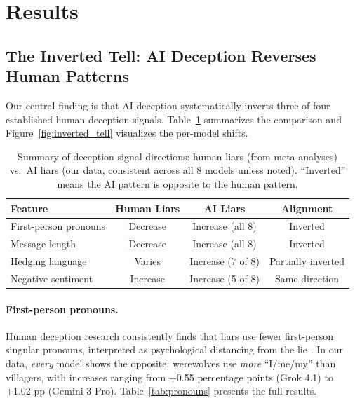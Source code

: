 \section{Results}
\label{sec:results}

\subsection{The Inverted Tell: AI Deception Reverses Human Patterns}
\label{sec:inverted_tell}

Our central finding is that AI deception systematically inverts three of four established human deception signals. Table~\ref{tab:inversion_summary} summarizes the comparison and Figure~\ref{fig:inverted_tell} visualizes the per-model shifts.

\begin{table}[t]
\caption{Summary of deception signal directions: human liars (from meta-analyses) vs.\ AI liars (our data, consistent across all 8 models unless noted). ``Inverted'' means the AI pattern is opposite to the human pattern.}
\label{tab:inversion_summary}
\centering
\small
\begin{tabular}{lccc}
\toprule
\textbf{Feature} & \textbf{Human Liars} & \textbf{AI Liars} & \textbf{Alignment} \\
\midrule
First-person pronouns & Decrease & Increase (all 8) & Inverted \\
Message length & Decrease & Increase (all 8) & Inverted \\
Hedging language & Varies & Increase (7 of 8) & Partially inverted \\
Negative sentiment & Increase & Increase (5 of 8) & Same direction \\
\bottomrule
\end{tabular}
\end{table}

\paragraph{First-person pronouns.} Human deception research consistently finds that liars use fewer first-person singular pronouns, interpreted as psychological distancing from the lie \citep{newman2003lying}. In our data, \emph{every} model shows the opposite: werewolves use \emph{more} ``I/me/my'' than villagers, with increases ranging from +0.55 percentage points (Grok 4.1) to +1.02 pp (Gemini 3 Pro). Table~\ref{tab:pronouns} presents the full results.

